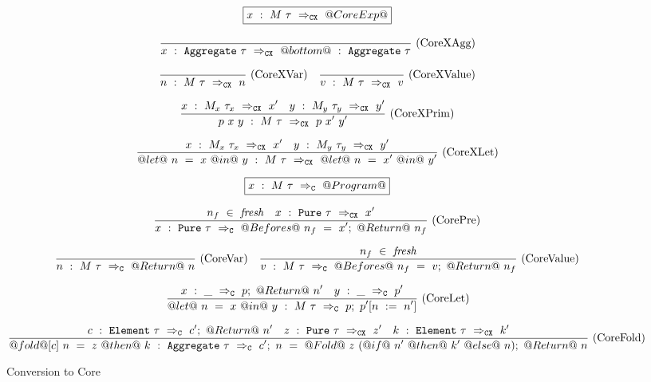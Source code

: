 
\begin{figure*}

\newcommand \acc {\tau_\mathit{acc}}
\newcommand \xtr {\tau_\mathit{extract}}
\newcommand \lam[1] {\lambda{} #1.~}

$$
\boxed{x~:~M~\tau~\Rightarrow_{\mathtt{CX}}~@CoreExp@}
$$

$$
\frac {\displaystyle 
} {\displaystyle  
    x~:~\mathtt{Aggregate}~\tau~\Rightarrow_{\mathtt{CX}}~@bottom@~:~\mathtt{Aggregate}~\tau
} \ 
\textrm{(CoreXAgg)}
$$

$$
\frac {\displaystyle 
} {\displaystyle  
    n~:~M~\tau~\Rightarrow_{\mathtt{CX}}~n
} \ 
\textrm{(CoreXVar)}
\quad
\frac {\displaystyle 
} {\displaystyle  
    v~:~M~\tau~\Rightarrow_{\mathtt{CX}}~v
} \ 
\textrm{(CoreXValue)}
$$

$$
\frac {\displaystyle 
    x~:~M_x~\tau_x~\Rightarrow_{\mathtt{CX}}~x'
    \quad
    y~:~M_y~\tau_y~\Rightarrow_{\mathtt{CX}}~y'
} {\displaystyle  
    p~x~y~:~M~\tau~\Rightarrow_{\mathtt{CX}}~p~x'~y'
} \ 
\textrm{(CoreXPrim)}
$$

$$
\frac {\displaystyle 
    x~:~M_x~\tau_x~\Rightarrow_{\mathtt{CX}}~x'
    \quad
    y~:~M_y~\tau_y~\Rightarrow_{\mathtt{CX}}~y'
} {\displaystyle  
    @let@~n~=~x~@in@~y~:~M~\tau~\Rightarrow_{\mathtt{CX}}~@let@~n~=~x'~@in@~y'
} \ 
\textrm{(CoreXLet)}
$$


$$
\boxed{x~:~M~\tau~\Rightarrow_{\mathtt{C}}~@Program@}
$$


$$
\frac {\displaystyle 
    n_f~\in~\mathit{fresh}
    \quad
    x~:~\mathtt{Pure}~\tau~\Rightarrow_{\mathtt{CX}}~x'
} {\displaystyle  
    x~:~\mathtt{Pure}~\tau~\Rightarrow_{\mathtt{C}}~@Befores@~n_f~=~x';~@Return@~n_f
} \ 
\textrm{(CorePre)}
$$

$$
\frac {\displaystyle 
} {\displaystyle  
    n~:~M~\tau~\Rightarrow_{\mathtt{C}}~@Return@~n
} \ 
\textrm{(CoreVar)}
\quad
\frac {\displaystyle 
    n_f~\in~\mathit{fresh}
} {\displaystyle  
    v~:~M~\tau~\Rightarrow_{\mathtt{C}}~@Befores@~n_f~=~v;~@Return@~n_f
} \ 
\textrm{(CoreValue)}
$$

$$
\frac {\displaystyle 
    x~:~\_~\Rightarrow_{\mathtt{C}}~p;~@Return@~n'
    \quad
    y~:~\_~\Rightarrow_{\mathtt{C}}~p'
} {\displaystyle  
    @let@~n~=~x~@in@~y~:~M~\tau~\Rightarrow_{\mathtt{C}}~p;~p'[n~:=~n']
} \ 
\textrm{(CoreLet)}
$$

$$
\frac {\displaystyle 
    c~:~\mathtt{Element}~\tau~\Rightarrow_{\mathtt{C}}~c';~@Return@~n'
    \quad
    z~:~\mathtt{Pure}~\tau~\Rightarrow_{\mathtt{CX}}~z'
    \quad
    k~:~\mathtt{Element}~\tau~\Rightarrow_{\mathtt{CX}}~k'
} {\displaystyle  
    @fold@[c]~n~=~z~@then@~k~:~\mathtt{Aggregate}~\tau~\Rightarrow_{\mathtt{C}}~c';~n~=~@Fold@~z~(@if@~n'~@then@~k'~@else@~n);~@Return@~n
} \ 
\textrm{(CoreFold)}
$$



\caption{Conversion to Core}
\label{fig:core:compile}
\end{figure*}


